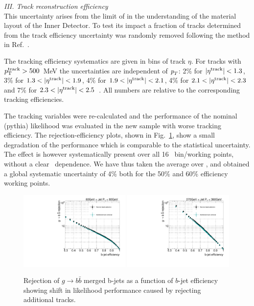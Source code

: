 %

\vspace{3mm}
{ \em III. Track reconstruction efficiency}
\\[3mm]
This uncertainty arises from the limit of in the understanding of the material layout of the Inner Detector. To test its impact a fraction of tracks determined from the track efficiency uncertainty was randomly removed following the method in Ref.~\cite{JetMassNote}.%

The tracking efficiency systematics are given in bins of track $\eta$. For tracks with $p_{\rm{T}}^{\rm{track}} > 500$~MeV the uncertainties are independent of ${\emph{p}_{T}}$:  2\% for $|\eta^{\rm{track}}|<1.3$, 3\% for $1.3<|\eta^{\rm{track}}|<1.9$, 4\% for $1.9<|\eta^{\rm{track}}|<2.1$, 4\% for $2.1<|\eta^{\rm{track}}|<2.3$ and 7\% for $2.3<|\eta^{\rm{track}}|<2.5$~\cite{chargemultiplicity}. All numbers are relative to the corresponding tracking efficiencies.  

The tracking variables were re-calculated and the performance of the nominal (pythia) likelihood was evaluated in the new sample with worse tracking efficiency. The rejection-efficiency plots, shown in Fig.~\ref{fig:trackefficiency}, show a small degradation of the performance which is comparable to the statistical uncertainty. The effect is however systematically present over all 16 \pt\ bin/working points, without a clear \pt\ dependence. We have thus taken the average over \pt, and obtained a global systematic uncertainty of 4\% both for the 50\% and 60\% efficiency working points.

\begin{figure}[tp]
\centering
\includegraphics[width=0.49\textwidth]{FIGS/systematics/LlhoodKDE_ISO_TrackingUncertaintyTest_rejvseff060.pdf}
\includegraphics[width=0.49\textwidth]{FIGS/systematics/LlhoodKDE_ISO_TrackingUncertaintyTest_rejvseff270.pdf}
\caption{Rejection of $g\rightarrow b \bar{b}$ merged b-jets as a function of $b$-jet efficiency showing shift in likelihood performance caused by rejecting additional tracks.}
\label{fig:trackefficiency}
\end{figure}

